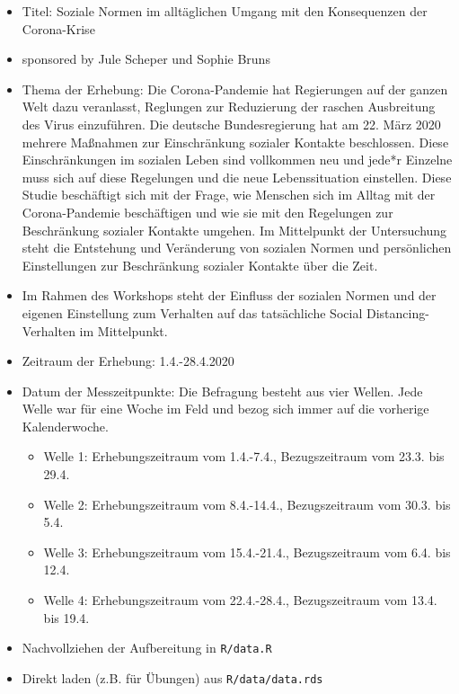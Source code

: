 \documentclass[]{book}
\providecommand{\tightlist}{%
  \setlength{\itemsep}{0pt}\setlength{\parskip}{0pt}}
\begin{document}
\begin{itemize}
\item
  Titel: Soziale Normen im alltäglichen Umgang mit den Konsequenzen der Corona-Krise
\item
  sponsored by Jule Scheper und Sophie Bruns
\item
  Thema der Erhebung: Die Corona-Pandemie hat Regierungen auf der ganzen Welt dazu veranlasst, Reglungen zur Reduzierung der raschen Ausbreitung des Virus einzuführen. Die deutsche Bundesregierung hat am 22. März 2020 mehrere Maßnahmen zur Einschränkung sozialer Kontakte beschlossen. Diese Einschränkungen im sozialen Leben sind vollkommen neu und jede*r Einzelne muss sich auf diese Regelungen und die neue Lebenssituation einstellen. Diese Studie beschäftigt sich mit der Frage, wie Menschen sich im Alltag mit der Corona-Pandemie beschäftigen und wie sie mit den Regelungen zur Beschränkung sozialer Kontakte umgehen. Im Mittelpunkt der Untersuchung steht die Entstehung und Veränderung von sozialen Normen und persönlichen Einstellungen zur Beschränkung sozialer Kontakte über die Zeit.
\item
  Im Rahmen des Workshops steht der Einfluss der sozialen Normen und der eigenen Einstellung zum Verhalten auf das tatsächliche Social Distancing-Verhalten im Mittelpunkt.
\item
  Zeitraum der Erhebung: 1.4.-28.4.2020
\item
  Datum der Messzeitpunkte: Die Befragung besteht aus vier Wellen. Jede Welle war für eine Woche im Feld und bezog sich immer auf die vorherige Kalenderwoche.

  \begin{itemize}
  \tightlist
  \item
    Welle 1: Erhebungszeitraum vom 1.4.-7.4., Bezugszeitraum vom 23.3. bis 29.4.
  \item
    Welle 2: Erhebungszeitraum vom 8.4.-14.4., Bezugszeitraum vom 30.3. bis 5.4.
  \item
    Welle 3: Erhebungszeitraum vom 15.4.-21.4., Bezugszeitraum vom 6.4. bis 12.4.
  \item
    Welle 4: Erhebungszeitraum vom 22.4.-28.4., Bezugszeitraum vom 13.4. bis 19.4.
  \end{itemize}
\item
  Nachvollziehen der Aufbereitung in \texttt{R/data.R}
\item
  Direkt laden (z.B. für Übungen) aus \texttt{R/data/data.rds}
\end{itemize}
\end{document}
